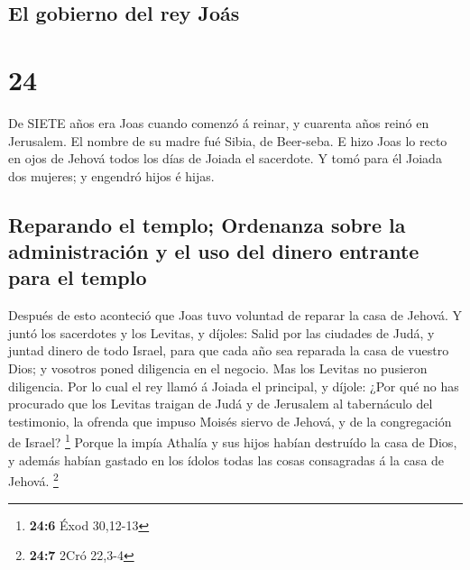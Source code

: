 \hypertarget{el-gobierno-del-rey-jouxe1s}{%
\subsection{El gobierno del rey
Joás}\label{el-gobierno-del-rey-jouxe1s}}

\hypertarget{section-23}{%
\section{24}\label{section-23}}

 De SIETE años era Joas cuando comenzó á reinar, y cuarenta
años reinó en Jerusalem. El nombre de su madre fué Sibia, de Beer-seba.
 E hizo Joas lo recto en ojos de Jehová todos los días de
Joiada el sacerdote.  Y tomó para él Joiada dos mujeres; y
engendró hijos é hijas.

\hypertarget{reparando-el-templo-ordenanza-sobre-la-administraciuxf3n-y-el-uso-del-dinero-entrante-para-el-templo}{%
\subsection{Reparando el templo; Ordenanza sobre la administración y el
uso del dinero entrante para el
templo}\label{reparando-el-templo-ordenanza-sobre-la-administraciuxf3n-y-el-uso-del-dinero-entrante-para-el-templo}}

 Después de esto aconteció que Joas tuvo voluntad de reparar
la casa de Jehová.  Y juntó los sacerdotes y los Levitas, y
díjoles: Salid por las ciudades de Judá, y juntad dinero de todo Israel,
para que cada año sea reparada la casa de vuestro Dios; y vosotros poned
diligencia en el negocio. Mas los Levitas no pusieron diligencia.
 Por lo cual el rey llamó á Joiada el principal, y díjole:
¿Por qué no has procurado que los Levitas traigan de Judá y de Jerusalem
al tabernáculo del testimonio, la ofrenda que impuso Moisés siervo de
Jehová, y de la congregación de Israel? \footnote{\textbf{24:6} Éxod
  30,12-13}  Porque la impía Athalía y sus hijos habían
destruído la casa de Dios, y además habían gastado en los ídolos todas
las cosas consagradas á la casa de Jehová. \footnote{\textbf{24:7} 2Cró
  22,3-4}

